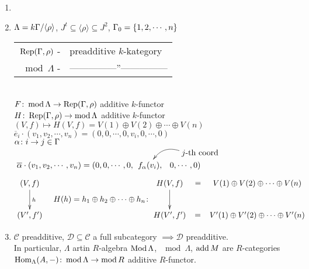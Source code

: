 \begin{exam}
\begin{enumerate}
\item[]
\item $\Lambda = k\Gamma / \langle \rho \rangle$, $J^t \subseteq \langle \rho \rangle \subseteq J^2$, $\Gamma_0 = \{ 1,2,\cdots, n \}$\\
\begin{tabular}{rl}
$\operatorname{Rep}(\Gamma, \rho)$ -& preadditive $k$-kategory\\
$\mod\Lambda$ -& ---------------''---------------
\end{tabular}\\
$F\colon \operatorname{mod}\nolimits\Lambda \to \operatorname{Rep}(\Gamma, \rho)$ additive $k$-functor\\
$H\colon \operatorname{Rep}(\Gamma, \rho) \to \operatorname{mod}\nolimits\Lambda$ additive $k$-functor\\
$(V, f) \mapsto H(V,f) = V(1) \oplus V(2) \oplus \cdots \oplus V(n)$\\
$\overline{e}_i \cdot (v_1, v_2, \cdots, v_n) = (0,0, \cdots, 0, v_i, 0, \cdots, 0)$\\
$\alpha\colon  i \to j \in \Gamma$\\
$\xymatrix@C-2pc@R-2pc{
 && *+[r]{j\text{-th coord}}\ar@/_1pc/[dl]\\
\overline{\alpha}\cdot (v_1, v_2, \cdots, v_n) = (0,0, \cdots, 0,& f_\alpha(v_i), & 0, \cdots, 0)
}$\\
\[\vcenter{\xymatrix{
(V,f) \ar[d]^h\\
(V', f')
}}
\;\;\;\;
H(h) = h_1 \oplus h_2 \oplus \cdots \oplus h_n\colon  \vcenter{\xymatrix{
H(V,f) \ar@{}[r]|-*[@]{=} \ar[d] & V(1) \oplus V(2) \oplus \cdots \oplus V(n)\\
H(V',f') \ar@{}[r]|-*[@]{=} & V'(1) \oplus V'(2) \oplus \cdots \oplus V'(n)\\
}}\]


\item $\mathcal{C}$ preadditive, $\mathcal{D} \subseteq \mathcal{C}$ a
  full subcategory $\implies \mathcal{D}$ preadditive.\\ 
In particular, $\Lambda$ artin $R$-algebra $\operatorname{Mod} \Lambda$, $\mod
\Lambda$, $\operatorname{add} M$ are $R$-categories\\ 
$\operatorname{Hom}_\Lambda(A, -)\colon  \operatorname{mod}\nolimits\Lambda \to \operatorname{mod}\nolimits R$ additive $R$-functor.
\end{enumerate}
\end{exam}

